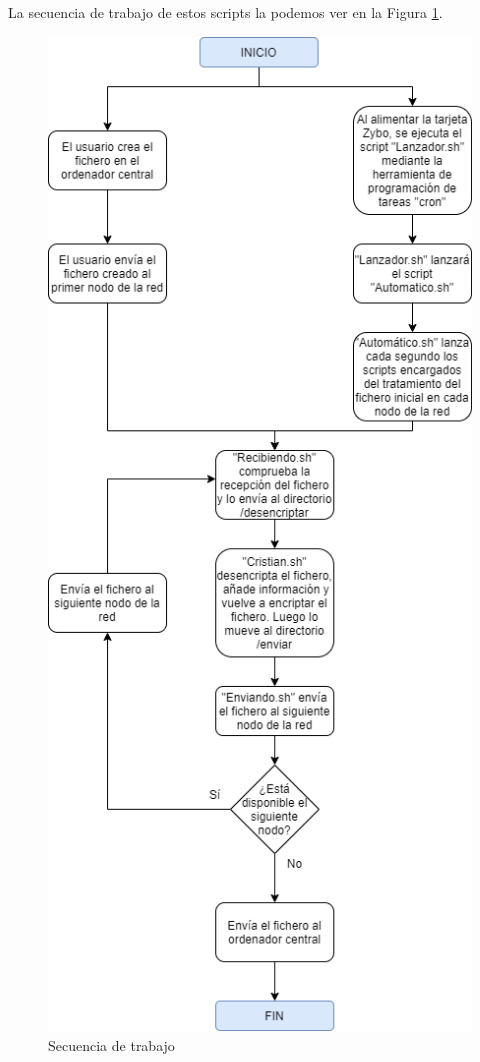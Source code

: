 La secuencia de trabajo de estos scripts la podemos ver en la Figura \ref{Secuencia de trabajo}.
\begin{figure}[h]
	\centering
	\includegraphics[scale=0.475]{Metodologia/AnalisisSistema/CadenaScripts.png}
	\caption{Secuencia de trabajo}
	\label{Secuencia de trabajo}
\end{figure}
\newpage